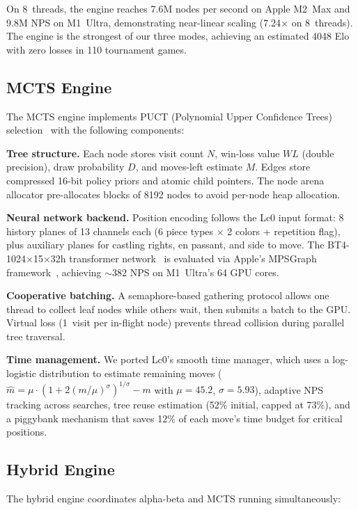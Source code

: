 \documentclass{svproc}
\begin{document}
On 8~threads, the engine reaches 7.6M nodes per second on Apple M2~Max and 9.8M NPS on M1~Ultra, demonstrating near-linear scaling (7.24$\times$ on 8~threads). The engine is the strongest of our three modes, achieving an estimated 4048 Elo with zero losses in 110 tournament games.

\subsection{MCTS Engine}
\label{sec:arch-mcts}

The MCTS engine implements PUCT (Polynomial Upper Confidence Trees) selection~\cite{rosin2011multi} with the following components:

\textbf{Tree structure.} Each node stores visit count $N$, win-loss value $W\!L$ (double precision), draw probability $D$, and moves-left estimate $M$. Edges store compressed 16-bit policy priors and atomic child pointers. The node arena allocator pre-allocates blocks of 8192 nodes to avoid per-node heap allocation.

\textbf{Neural network backend.} Position encoding follows the Lc0 input format: 8 history planes of 13 channels each (6 piece types $\times$ 2 colors + repetition flag), plus auxiliary planes for castling rights, en passant, and side to move. The BT4-1024$\times$15$\times$32h transformer network~\cite{lc0} is evaluated via Apple's MPSGraph framework~\cite{apple2022metal}, achieving $\sim$382 NPS on M1~Ultra's 64 GPU cores.

\textbf{Cooperative batching.} A semaphore-based gathering protocol allows one thread to collect leaf nodes while others wait, then submits a batch to the GPU. Virtual loss (1~visit per in-flight node) prevents thread collision during parallel tree traversal.

\textbf{Time management.} We ported Lc0's smooth time manager, which uses a log-logistic distribution to estimate remaining moves ($\hat{m} = \mu \cdot (1 + 2(m/\mu)^\sigma)^{1/\sigma} - m$ with $\mu=45.2$, $\sigma=5.93$), adaptive NPS tracking across searches, tree reuse estimation (52\% initial, capped at 73\%), and a piggybank mechanism that saves 12\% of each move's time budget for critical positions.

\subsection{Hybrid Engine}
\label{sec:arch-hybrid}

The hybrid engine coordinates alpha-beta and MCTS running simultaneously:
\end{document}
